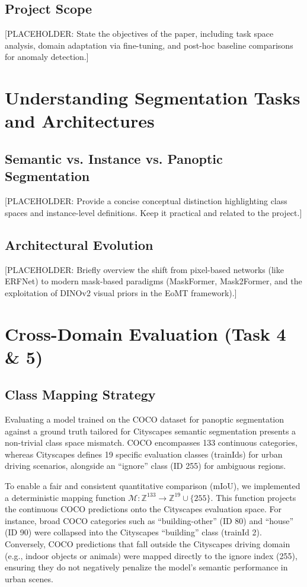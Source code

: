 \documentclass[10pt,conference]{IEEEtran}
\begin{document}
\subsection{Project Scope}
[PLACEHOLDER: State the objectives of the paper, including task space analysis, domain adaptation via fine-tuning, and post-hoc baseline comparisons for anomaly detection.]

\section{Understanding Segmentation Tasks and Architectures}

\subsection{Semantic vs. Instance vs. Panoptic Segmentation}
[PLACEHOLDER: Provide a concise conceptual distinction highlighting class spaces and instance-level definitions. Keep it practical and related to the project.]

\subsection{Architectural Evolution}
[PLACEHOLDER: Briefly overview the shift from pixel-based networks (like ERFNet) to modern mask-based paradigms (MaskFormer, Mask2Former, and the exploitation of DINOv2 visual priors in the EoMT framework).]

\section{Cross-Domain Evaluation (Task 4 \& 5)}

\subsection{Class Mapping Strategy}
Evaluating a model trained on the COCO dataset for panoptic segmentation against a ground truth tailored for Cityscapes semantic segmentation presents a non-trivial class space mismatch. COCO encompasses 133 continuous categories, whereas Cityscapes defines 19 specific evaluation classes (trainIds) for urban driving scenarios, alongside an ``ignore'' class (ID 255) for ambiguous regions.

To enable a fair and consistent quantitative comparison (mIoU), we implemented a deterministic mapping function $\mathcal{M}: \mathbb{Z}^{133} \rightarrow \mathbb{Z}^{19} \cup \{255\}$. This function projects the continuous COCO predictions onto the Cityscapes evaluation space. For instance, broad COCO categories such as ``building-other'' (ID 80) and ``house'' (ID 90) were collapsed into the Cityscapes ``building'' class (trainId 2). Conversely, COCO predictions that fall outside the Cityscapes driving domain (e.g., indoor objects or animals) were mapped directly to the ignore index (255), ensuring they do not negatively penalize the model's semantic performance in urban scenes. 
\end{document}
